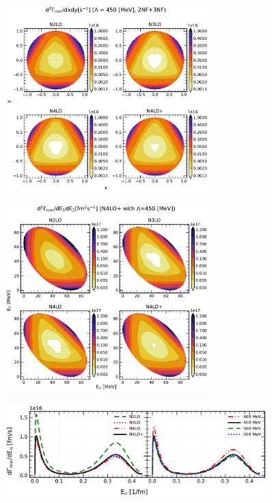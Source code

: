     \begin{figure}[h]
        \begin{center}
        \includegraphics[width=0.7\textwidth]{PlotData/PION/Dalitz_maps/figures/Dalitz_map_nnn_xy_orders.pdf}
        \end{center}
        \caption{}
        \label{pion_nnn_xy_order}
    \end{figure}

    \begin{figure}[h]
        \begin{center}
        \includegraphics[width=0.7\textwidth]{PlotData/PION/Dalitz_maps/figures/Dalitz_map_nnn_E1E2_orders.pdf}
        \end{center}
        \caption{}
        \label{pion_nnn_E1E2_order}
    \end{figure}

    \begin{figure}[h]
        \begin{center}
        \includegraphics[width=0.9\textwidth]{PlotData/PION/Dalitz_maps/figures/3H_dGdEn.pdf}
        \end{center}
        \caption{}
        \label{pion_dGdEn_3H}
    \end{figure}

